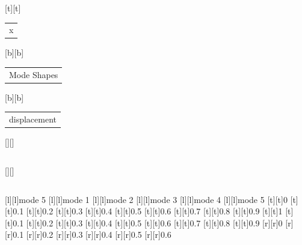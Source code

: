 %    
%
%
\begin{psfrags}%
\psfragscanon%
%
[t][t]{\color[rgb]{0,0,0}\setlength{\tabcolsep}{0pt}\begin{tabular}{c}{x}\end{tabular}}%
[b][b]{\color[rgb]{0,0,0}\setlength{\tabcolsep}{0pt}\begin{tabular}{c}Mode Shapes\\\end{tabular}}%
[b][b]{\color[rgb]{0,0,0}\setlength{\tabcolsep}{0pt}\begin{tabular}{c}displacement\end{tabular}}%
[][]{\color[rgb]{0,0,0}\setlength{\tabcolsep}{0pt}\begin{tabular}{c} \end{tabular}}%
[][]{\color[rgb]{0,0,0}\setlength{\tabcolsep}{0pt}\begin{tabular}{c} \end{tabular}}%
[l][l]{\color[rgb]{0,0,0}mode 5}%
[l][l]{\color[rgb]{0,0,0}mode 1}%
[l][l]{\color[rgb]{0,0,0}mode 2}%
[l][l]{\color[rgb]{0,0,0}mode 3}%
[l][l]{\color[rgb]{0,0,0}mode 4}%
[l][l]{\color[rgb]{0,0,0}mode 5}%
%
[t][t]{0}%
[t][t]{0.1}%
[t][t]{0.2}%
[t][t]{0.3}%
[t][t]{0.4}%
[t][t]{0.5}%
[t][t]{0.6}%
[t][t]{0.7}%
[t][t]{0.8}%
[t][t]{0.9}%
[t][t]{1}%
[t][t]{0.1}%
[t][t]{0.2}%
[t][t]{0.3}%
[t][t]{0.4}%
[t][t]{0.5}%
[t][t]{0.6}%
[t][t]{0.7}%
[t][t]{0.8}%
[t][t]{0.9}%
%
[r][r]{0}%
[r][r]{0.1}%
[r][r]{0.2}%
[r][r]{0.3}%
[r][r]{0.4}%
[r][r]{0.5}%
[r][r]{0.6}%

\end{psfrags}
